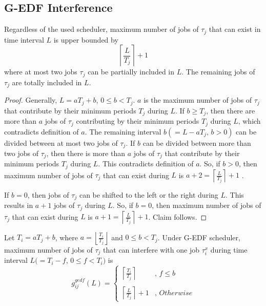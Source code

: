 \subsection{\label{sec:g-edf interference and workload}G-EDF Interference}
%
\begin{clm}\label{clm:max_job_no_exist_j_interval_r}
%
Regardless of the used scheduler, maximum number of jobs of $\tau_{j}$
that can exist in time interval $L$ is upper bounded by 
\begin{equation}
\left\lceil\frac{L}{T_{j}}\right\rceil+1\label{eq:max_job_no_exist_j_interval_r}
\end{equation}
where at most two jobs $\tau_{j}$ can be partially included in $L$.
The remaining jobs of $\tau_{j}$ are totally included in $L$.
%
\end{clm}
%
\begin{proof}
%
Generally, $L=aT_{j}+b$, $0\le b<T_{j}$. $a$ is the maximum number
of jobs of $\tau_{j}$ that contribute by their minimum periods $T_{j}$
during $L$. If $b\ge T_{j}$, then there are more than $a$ jobs
of $\tau_{j}$ contributing by their minimum periods $T_{j}$ during
$L$, which contradicts definition of $a$. The remaining interval
$b(=L-aT_{j},\, b>0)$ can be divided between at most two jobs of
$\tau_{j}$. If $b$ can be divided between more than two jobs of
$\tau_{j}$, then there is more than $a$ jobs of $\tau_{j}$ that
contribute by their minimum periods $T_{j}$ during $L$. This contradicts
definition of $a$. So, if $b>0$, then maximum number of jobs of
$\tau_{j}$ that can exist during $L$ is $a+2=\left\lceil \frac{L}{T_{j}}\right\rceil +1$
.

If $b=0$, then jobs of $\tau_{j}$ can be shifted to the left or
the right during $L$. This results in $a+1$ jobs of $\tau_{j}$
during $L$. So, if $b=0$, then maximum number of jobs of $\tau_{j}$
that can exist during $L$ is $a+1=\left\lceil \frac{L}{T_{j}}\right\rceil +1$.
Claim follows. 
%
\end{proof}
%
\begin{clm}\label{clm:gedf_max_job_no_interfer_j_i}
%
Let $T_{i}=aT_{j}+b$, where $a=\left\lfloor\frac{T_i}{T_j}\right\rfloor$ and $0\le b<T_{j}$. Under G-EDF scheduler, maximum
number of jobs of $\tau_{j}$ that can interfere with one job $\tau_{i}^{x}$
during time interval $L(=T_{i}-f$, $0\le f<T_{i})$ is 
\begin{equation}
g_{ij}^{gedf}\left(L\right)=
\begin{cases}
\left\lceil \frac{T_{i}}{T_{j}}\right\rceil  & ,\, f\le b\\
\\
\left\lceil \frac{L}{T_{j}}\right\rceil +1 & ,\, Otherwise
\end{cases}\label{eq:gedf_max_job_no_interfer_j_i}
\end{equation}
%
\end{clm}
